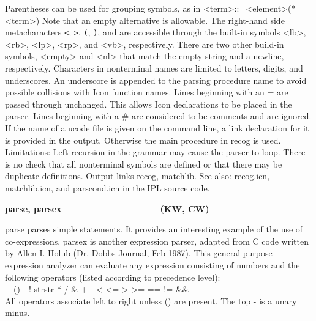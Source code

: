 {


Parentheses can be used for grouping symbols, as in
\textsf{{\textless}term{\textgreater}::={\textless}element{\textgreater}({\textbar}*{\textless}term{\textgreater})
}Note that an empty alternative is allowable. The right-hand side
metacharacters \texttt{{\textless}}, \texttt{{\textgreater}},
\texttt{(}, \texttt{)}, and \texttt{{\textbar}} are accessible through
the built-in symbols \textsf{{\textless}lb{\textgreater}},
\textsf{{\textless}rb{\textgreater}},
\textsf{{\textless}lp{\textgreater}},
\textsf{{\textless}rp{\textgreater}}, and
\textsf{{\textless}vb{\textgreater}}, respectively. There are two other
build-in symbols, \textsf{{\textless}empty{\textgreater}} and
\textsf{{\textless}nl{\textgreater}} that match the empty string and a
newline, respectively. Characters in nonterminal names are limited to
letters, digits, and underscores. An underscore is appended to the
parsing procedure name to avoid possible collisions with Icon function
names. Lines beginning with an = are passed through unchanged. This
allows Icon declarations to be placed in the parser. Lines beginning
with a \# are considered to be comments and are ignored.
If the name of a ucode file is given on the command line, a
link declaration for it is provided in the output.
Otherwise the main procedure in \textsf{recog} is used. Limitations:
Left recursion in the grammar may cause the parser to
loop. There is no check that all nonterminal symbols are defined or
that there may be duplicate definitions. Output links \textsf{recog},
\textsf{matchlib}. See also: \textsf{recog.icn}, \textsf{matchlib.icn},
and \textsf{parscond.icn} in the IPL source code. 

{\sffamily\bfseries
parse, parsex\ \ \ \ \ \ \ \ \ \ \ \ \ \ \ \  \ \ \ \ (KW, CW)}

\textsf{parse} parses simple statements. It provides an
interesting example of the use of co-expressions. \textsf{parsex} is
another expression parser, adapted from C code written by Allen I.
Holub (Dr. Dobb{\textquotesingle}s Journal, Feb 1987). This
general-purpose expression analyzer can evaluate any expression
consisting of numbers and the following operators (listed according to
precedence level):\\
\textsf{\ \ () - !
{\textquotesingle}str{\textquotesingle}str{\textquotesingle} * / \& + -
{\textless} {\textless}= {\textgreater} {\textgreater}= == != \&\&
{\textbar}{\textbar}} \\
All operators associate left to right unless () are present. The top -
is a unary minus. 

}
